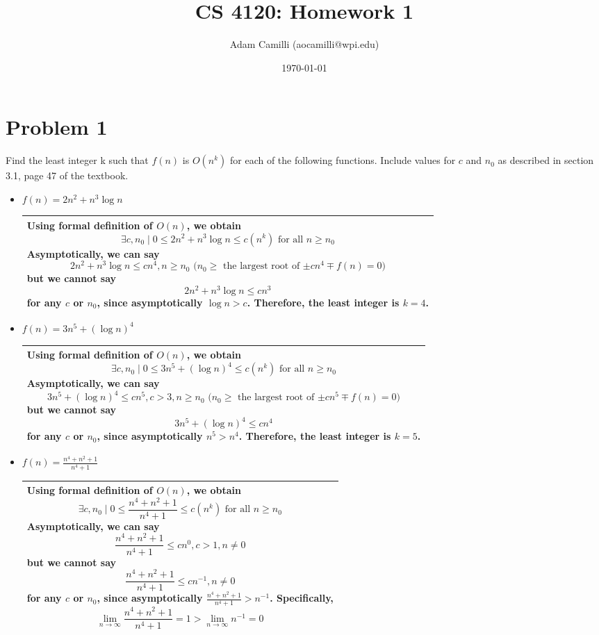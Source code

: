 \documentclass[10pt]{article}
\newenvironment{answer}
    {\begin{center}
    \begin{tabular}{|p{1\textwidth}|}
    \hline
    }
    { 
    \\\hline
    \end{tabular} 
    \end{center}
    }
\begin{document}
\title{CS 4120: Homework 1}
\author{Adam Camilli (aocamilli@wpi.edu)}
\date{\today}
\maketitle

\section*{Problem 1}
Find the least integer k such that $f(n)$ is $O(n^k)$ for each of the following functions. Include values for $c$ and $n_0$ as described in section 3.1, page 47 of the
textbook.
\begin{itemize}
\item $f(n) = 2n^2 + n^3 \log n$
  \begin{answer}
    Using formal definition of $O(n)$, we obtain
    \[\exists c,n_0 \mid 0 \le 2n^2 + n^3 \log n \le c(n^k) \textrm{ for all $n \ge n_0$}\]
    Asymptotically, we can say
    \[ 2n^2 + n^3 \log n \le cn^4, n \ge n_0 \textrm{  ($n_0 \ge $ the largest root of $\pm cn^4 \mp f(n) = 0$)}\]
    but we cannot say 
    \[ 2n^2 + n^3 \log n \le cn^3 \]
    for any $c$ or $n_0$, since asymptotically $\log n > c$.
    Therefore, the least integer is $k = 4$.
  \end{answer}
\item $f(n) = 3n^5 + (\log n)^4$ 
  \begin{answer}
    Using formal definition of $O(n)$, we obtain
    \[\exists c,n_0 \mid 0 \le 3n^5 + (\log n)^4 \le c(n^k) \textrm{ for all $n \ge n_0$}\]
    Asymptotically, we can say
    \[ 3n^5 + (\log n)^4 \le cn^5, c > 3, n \ge n_0 \textrm{ ($n_0 \ge $ the largest root of $\pm cn^5 \mp f(n) = 0$)}  \]
    but we cannot say 
    \[ 3n^5 + (\log n)^4 \le cn^4 \]
    for any $c$ or $n_0$, since asymptotically $n^5 > n^4$.
    Therefore, the least integer is $k = 5$.
  \end{answer}

\newpage

\item $f(n) = \frac{n^4 + n^2 + 1}{n^4 + 1}$
  \begin{answer}
    Using formal definition of $O(n)$, we obtain
    \[\exists c,n_0 \mid 0 \le \frac{n^4 + n^2 + 1}{n^4 + 1} \le c(n^k) \textrm{ for all $n \ge n_0$}\]
    Asymptotically, we can say
    \[ \frac{n^4 + n^2 + 1}{n^4 + 1} \le cn^0, c > 1, n \neq 0\]
    but we cannot say 
    \[ \frac{n^4 + n^2 + 1}{n^4 + 1} \le cn^{-1} , n \neq 0\]
    for any $c$ or $n_0$, since asymptotically $\frac{n^4 + n^2 + 1}{n^4 + 1} > n^{-1}$. Specifically,
    \[ \lim_{n\to\infty}\frac{n^4 + n^2 + 1}{n^4 + 1} = 1 > \lim_{n\to\infty}n^{-1}= 0 \]


\end{answer}
\end{itemize}
\end{document}
